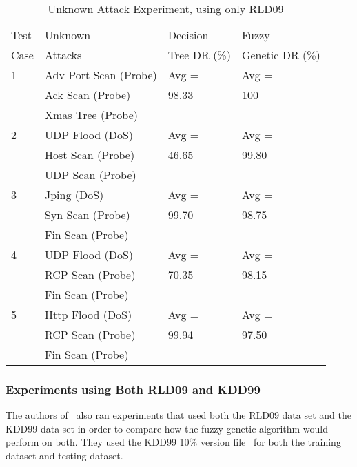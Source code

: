 \documentclass{sig-alternate}
\begin{document}
\begin{table}
\caption{Unknown Attack Experiment, using only RLD09}
\vspace{0.20cm}
\begin{tabular}{llll}
Test & Unknown & Decision & Fuzzy\\
Case & Attacks & Tree DR (\%)  & Genetic DR (\%)\\ \hline

1 & Adv Port Scan (Probe) & Avg = & Avg =\\
  & Ack Scan (Probe)		  & 98.33 & 100\\
  & Xmas Tree (Probe)		  &		  &\\ \hline

2 & UDP Flood (DoS) & Avg = & Avg =\\
  & Host Scan (Probe) & 46.65 & 99.80\\
  & UDP Scan (Probe)  &       &\\ \hline

3 & Jping (DoS)    & Avg =          & Avg =\\
  & Syn Scan (Probe) & 99.70 & 98.75\\
  & Fin Scan (Probe) &                &\\ \hline

4 & UDP Flood (DoS) & Avg = & Avg =\\
  & RCP Scan (Probe)  & 70.35 & 98.15\\
  & Fin Scan (Probe)  &       &\\ \hline

5 & Http Flood (DoS) & Avg =          & Avg =\\
  & RCP Scan (Probe)  & 99.94 & 97.50\\
  & Fin Scan (Probe) &                &\\
\hline\end{tabular}
\label{tab:fuzGenExp2}
\end{table}




\subsubsection{Experiments using Both RLD09 and KDD99}
The authors of~\cite{6496342, 6559603} also ran experiments that used both the RLD09 data set and the KDD99 data set in order to compare how the fuzzy genetic algorithm would perform on both. They used the KDD99 10\% version file~\cite{KDD99} for both the training dataset and testing dataset.
\end{document}
